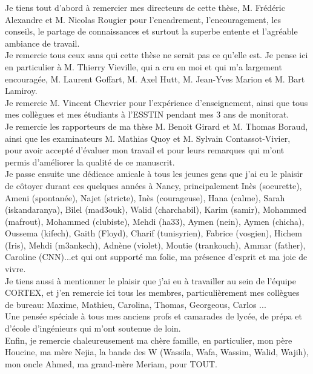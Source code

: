 \documentclass[11pt,utf8x]{thloria}
\begin{document}
\begin{ThesisAcknowledgments}

Je tiens tout d'abord à remercier mes directeurs de cette thèse, M. Frédéric Alexandre et M. Nicolas Rougier pour l'encadrement, l'encouragement, les conseils, le partage de connaissances et surtout la superbe entente et l'agréable ambiance de travail.\\

Je remercie tous ceux sans qui cette thèse ne serait pas ce qu'elle est. Je pense ici en particulier à M. Thierry Vieville, qui a cru en moi et qui m'a largement encouragée, M. Laurent Goffart, M. Axel Hutt, M. Jean-Yves Marion et M. Bart Lamiroy.\\

Je remercie M. Vincent Chevrier pour l'expérience d'enseignement, ainsi que tous mes collègues et mes étudiants à l'ESSTIN pendant mes 3 ans de monitorat.\\

Je remercie les rapporteurs de ma thèse M. Benoit Girard et M. Thomas Boraud, ainsi que les examinateurs M. Mathias Quoy et M. Sylvain Contassot-Vivier, pour avoir accepté d'évaluer mon travail et pour leurs remarques qui m'ont permis d'améliorer la qualité de ce manuscrit.\\

Je passe ensuite une dédicace amicale à tous les jeunes gens que j'ai eu le plaisir de côtoyer durant ces quelques années à Nancy, principalement Inès (soeurette), Ameni (spontanée), Najet (stricte), Inès (courageuse), Hana (calme), Sarah (iskandaranya), Bilel (mad3ouk), Walid (charchabil), Karim (samir), Mohammed (mafrout), Mohammed (clubiste), Mehdi (ha33), Aymen (nein), Aymen (chicha), Oussema (kifech), Gaith (Floyd), Charif (tunisyrien), Fabrice (vosgien), Hichem (Iris), Mehdi (m3ankech), Adnène (violet), Moutie (trankouch), Ammar (father), Caroline (CNN)...et qui ont supporté ma folie, ma présence d'esprit et ma joie de vivre.\\

Je tiens aussi à mentionner le plaisir que j'ai eu à travailler au sein de l'équipe CORTEX, et j'en remercie ici tous les membres, particulièrement mes collègues de bureau: Maxime, Mathieu, Carolina, Thomas, Georgeous, Carlos ...\\

Une pensée spéciale à tous mes anciens profs et camarades de lycée, de prépa et d'école d'ingénieurs qui m'ont soutenue de loin.\\

Enfin, je remercie chaleureusement ma chère famille, en particulier, mon père Houcine, ma mère Nejia, la bande des W (Wassila, Wafa, Wassim, Walid, Wajih), mon oncle Ahmed, ma grand-mère Meriam, pour TOUT.\\


\end{ThesisAcknowledgments}
\end{document}
